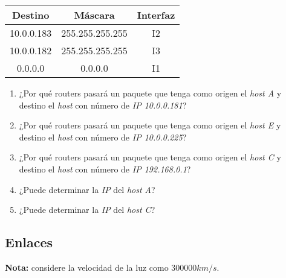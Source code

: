 \documentclass[12pt]{article}
\begin{document}
\begin{tabular}{|c|c|c|}
    \hline
    Destino & Máscara & Interfaz \\
    \hline
    10.0.0.183 & 255.255.255.255 & I2 \\
    \hline
    10.0.0.182 & 255.255.255.255 & I3 \\
    \hline
    0.0.0.0 & 0.0.0.0 & I1 \\
    \hline
\end{tabular}

\begin{enumerate}

    \item ¿Por qué routers pasará un paquete que tenga como origen el
        \emph{host A} y destino el \emph{host} con número de \emph{IP
        10.0.0.181}?

    \item ¿Por qué routers pasará un paquete que tenga como origen el
        \emph{host E} y destino el \emph{host} con número de \emph{IP
        10.0.0.225}?

    \item ¿Por qué routers pasará un paquete que tenga como origen el
        \emph{host C} y destino el \emph{host} con número de \emph{IP
        192.168.0.1}?

    \item ¿Puede determinar la \emph{IP} del \emph{host A}?

    \item ¿Puede determinar la \emph{IP} del \emph{host C}?

\end{enumerate}

\subsection*{Enlaces}

\textbf{Nota:} considere la velocidad de la luz como $300000 km/s$.
\end{document}
